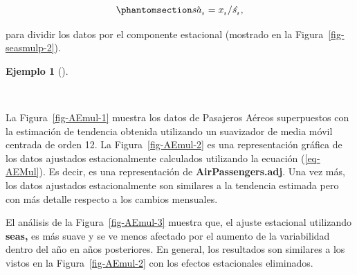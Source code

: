 \documentclass[
  us-letterpaper,
]{scrreprt}
\newenvironment{Shaded}{\begin{snugshade}}{\end{snugshade}}
\newcommand{\AttributeTok}[1]{\textcolor[rgb]{0.40,0.45,0.13}{#1}}
\newcommand{\DecValTok}[1]{\textcolor[rgb]{0.68,0.00,0.00}{#1}}
\newcommand{\FunctionTok}[1]{\textcolor[rgb]{0.28,0.35,0.67}{#1}}
\newcommand{\NormalTok}[1]{\textcolor[rgb]{0.00,0.23,0.31}{#1}}
\newcommand{\OtherTok}[1]{\textcolor[rgb]{0.00,0.23,0.31}{#1}}
\newcommand{\SpecialCharTok}[1]{\textcolor[rgb]{0.37,0.37,0.37}{#1}}
\theoremstyle{plain}
\theoremstyle{definition}
\theoremstyle{definition}
\newtheorem{example}{Ejemplo}[chapter]
\theoremstyle{plain}
\theoremstyle{remark}
\begin{document}
\begin{equation}\phantomsection\label{eq-AEMul}{
\hat{sa_{_t}}=x_{_t}/\hat{s_{_t}},
}\end{equation}

para dividir los datos por el componente estacional (mostrado en la
Figura~\ref{fig-seasmulp-2}).

\begin{example}[]\protect\hypertarget{exm-aeair}{}\label{exm-aeair}

~

\begin{tcolorbox}[enhanced jigsaw, bottomtitle=1mm, coltitle=black, breakable, leftrule=.75mm, left=2mm, rightrule=.15mm, titlerule=0mm, toprule=.15mm, toptitle=1mm, colback=white, colframe=quarto-callout-caution-color-frame, title={AirPassengers}, colbacktitle=quarto-callout-caution-color!10!white, arc=.35mm, bottomrule=.15mm, opacitybacktitle=0.6, opacityback=0]

La Figura~\ref{fig-AEmul-1} muestra los datos de Pasajeros Aéreos
superpuestos con la estimación de tendencia obtenida utilizando un
suavizador de media móvil centrada de orden 12. La
Figura~\ref{fig-AEmul-2} es una representación gráfica de los datos
ajustados estacionalmente calculados utilizando la ecuación
(\ref{eq-AEMul}). Es decir, es una representación de
\textbf{AirPassengers.adj}. Una vez más, los datos ajustados
estacionalmente son similares a la tendencia estimada pero con más
detalle respecto a los cambios mensuales.

El análisis de la Figura~\ref{fig-AEmul-3} muestra que, el ajuste
estacional utilizando \textbf{seas,} es más suave y se ve menos afectado
por el aumento de la variabilidad dentro del año en años posteriores. En
general, los resultados son similares a los vistos en la
Figura~\ref{fig-AEmul-2} con los efectos estacionales eliminados.

\begin{Shaded}
\end{Shaded}


\end{tcolorbox}
\end{example}
\end{document}
